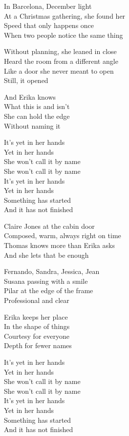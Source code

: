 \begin{lyrics}
In Barcelona, December light\\
At a Christmas gathering, she found her\\
Speed that only happens once\\
When two people notice the same thing

Without planning, she leaned in close\\
Heard the room from a different angle\\
Like a door she never meant to open\\
Still, it opened

And Erika knows\\
What this is and isn’t\\
She can hold the edge\\
Without naming it

It’s yet in her hands\\
Yet in her hands\\
She won’t call it by name\\
She won’t call it by name\\
It’s yet in her hands\\
Yet in her hands\\
Something has started\\
And it has not finished

Claire Jones at the cabin door\\
Composed, warm, always right on time\\
Thomas knows more than Erika asks\\
And she lets that be enough

Fernando, Sandra, Jessica, Jean\\
Susana passing with a smile\\
Pilar at the edge of the frame\\
Professional and clear

Erika keeps her place\\
In the shape of things\\
Courtesy for everyone\\
Depth for fewer names

It’s yet in her hands\\
Yet in her hands\\
She won’t call it by name\\
She won’t call it by name\\
It’s yet in her hands\\
Yet in her hands\\
Something has started\\
And it has not finished


\end{lyrics}
